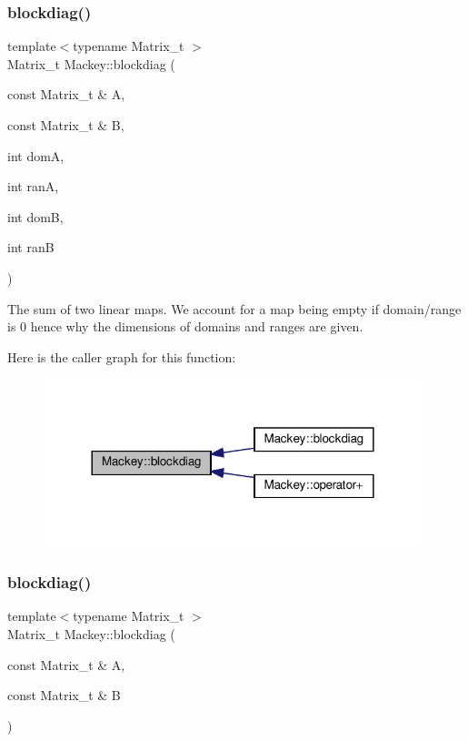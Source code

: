 \subsubsection{\texorpdfstring{blockdiag()}{blockdiag()}\hspace{0.1cm}{\footnotesize\ttfamily [1/2]}}
{\footnotesize\ttfamily template$<$typename Matrix\+\_\+t $>$ \\
Matrix\+\_\+t Mackey\+::blockdiag (\begin{DoxyParamCaption}\item[{const Matrix\+\_\+t \&}]{A,  }\item[{const Matrix\+\_\+t \&}]{B,  }\item[{int}]{domA,  }\item[{int}]{ranA,  }\item[{int}]{domB,  }\item[{int}]{ranB }\end{DoxyParamCaption})}



The sum of two linear maps. We account for a map being empty if domain/range is 0 hence why the dimensions of domains and ranges are given. 

Here is the caller graph for this function\+:\nopagebreak
\begin{figure}[H]
\begin{center}
\leavevmode
\includegraphics[width=312pt]{namespaceMackey_a6d2d912037da84c6884ac62db997cc0f_icgraph}
\end{center}
\end{figure}
\mbox{\label{namespaceMackey_a64d299f4b6f36e4b4e873b56a44b14b0}} 
\subsubsection{\texorpdfstring{blockdiag()}{blockdiag()}\hspace{0.1cm}{\footnotesize\ttfamily [2/2]}}
{\footnotesize\ttfamily template$<$typename Matrix\+\_\+t $>$ \\
Matrix\+\_\+t Mackey\+::blockdiag (\begin{DoxyParamCaption}\item[{const Matrix\+\_\+t \&}]{A,  }\item[{const Matrix\+\_\+t \&}]{B }\end{DoxyParamCaption})}



